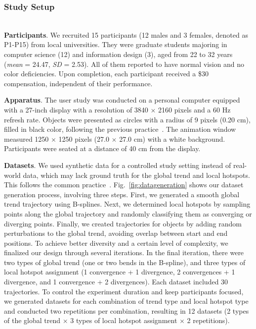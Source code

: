\newcommand{\track}{\textit{Task 1---Tracking objects' movements}}
\newcommand{\trend}{\textit{Task 2---Identifying the global trend}}
\newcommand{\hotspot}{\textit{Task 3---Locating local hotspots}}
\newcommand{\myquote}[1]{\textit{``#1''}}




\subsubsection{Study Setup}

\noindent\textbf{\\ Participants}. 
We recruited 15 participants (12 males and 3 females, denoted as P1-P15) from local universities.
They were graduate students majoring in computer science (12) and information design (3), aged from 22 to 32 years (\textit{mean} = 24.47, \textit{SD} = 2.53).
All of them reported to have normal vision and no color deficiencies.
Upon completion, each participant received a \$30 compensation, independent of their performance. 


\noindent\textbf{Apparatus}. 
The user study was conducted on a personal computer equipped with a 27-inch display with a resolution of 3840 $\times$ 2160 pixels and a 60 Hz refresh rate.
Objects were presented as circles with a radius of 9 pixels (0.20 cm), filled in black color, following the previous practice~\cite{du2015trajectory,wang2017vector}.
The animation window measured 1250 $\times$ 1250 pixels (27.0 $\times$ 27.0 cm) with a white background.
Participants were seated at a distance of 40 cm from the display.

\noindent\textbf{Datasets}.
We used synthetic data for a controlled study setting instead of real-world data, which may lack ground truth for the global trend and local hotspots.
This follows the common practice~\cite{du2015trajectory,wang2017vector}. 
Fig.~\ref{fig:datageneration} shows our dataset generation process, involving three steps.
First, we generated a smooth global trend trajectory using B-splines.
Next, we determined local hotspots by sampling points along the global trajectory and randomly classifying them as converging or diverging points.
Finally, we created trajectories for objects by adding random perturbations to the global trend, avoiding overlap between start and end positions.
To achieve better diversity and a certain level of complexity, we finalized our design through several iterations.
In the final iteration, there were two types of global trend (one or two bends in the B-spline), and three types of local hotspot assignment (1 convergence + 1 divergence, 2 convergences + 1 divergence, and 1 convergence + 2 divergences).
Each dataset included 30 trajectories.
To control the experiment duration and keep participants focused, we generated datasets for each combination of trend type and local hotspot type and conducted two repetitions per combination, resulting in 12 datasets (2 types of the global trend $\times$ 3 types of local hotspot assignment $\times$ 2 repetitions).


